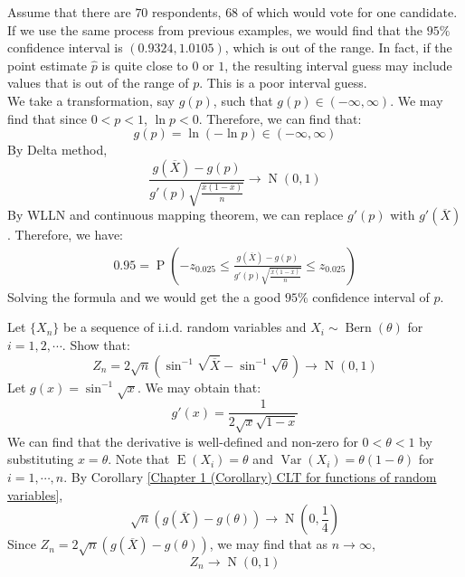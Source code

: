 \documentclass{huhtakm-template-book-v2}
\DeclareMathOperator{\prob}{P}
\DeclareMathOperator{\E}{E}
\DeclareMathOperator{\Var}{Var}
\DeclareMathOperator{\Bern}{Bern}
\DeclareMathOperator{\N}{N}
\begin{document}
\begin{eg}
	Assume that there are $70$ respondents, $68$ of which would vote for one candidate.\\
	If we use the same process from previous examples, we would find that the $95\%$ confidence interval is $(0.9324,1.0105)$, which is out of the range. In fact, if the point estimate $\hat{p}$ is quite close to $0$ or $1$, the resulting interval guess may include values that is out of the range of $p$. This is a poor interval guess.\\
	We take a transformation, say $g(p)$, such that $g(p)\in(-\infty,\infty)$. We may find that since $0<p<1$, $\ln{p}<0$. Therefore, we can find that:
	\begin{equation*}
		g(p)=\ln(-\ln{p})\in(-\infty,\infty)
	\end{equation*}
	By Delta method,
	\begin{equation*}
		\frac{g(\overline{X})-g(p)}{g'(p)\sqrt{\frac{\overline{x}(1-\overline{x})}{n}}}\to\N(0,1)
	\end{equation*}
	By WLLN and continuous mapping theorem, we can replace $g'(p)$ with $g'(\overline{X})$. Therefore, we have:
	\begin{align*}
		0.95=\prob\left(-z_{0.025}\leq	\frac{g(\overline{X})-g(p)}{g'(p)\sqrt{\frac{\overline{x}(1-\overline{x})}{n}}}\leq z_{0.025}\right)
	\end{align*}
	Solving the formula and we would get the a good $95\%$ confidence interval of $p$.
\end{eg}
\begin{eg}
	Let $\{X_{n}\}$ be a sequence of i.i.d. random variables and $X_{i}\sim\Bern(\theta)$ for $i=1,2,\cdots$. Show that:
	\begin{equation*}
		Z_{n}=2\sqrt{n}\left(\sin^{-1}{\sqrt{\overline{X}}}-\sin^{-1}{\sqrt{\theta}}\right)\to\N(0,1)
	\end{equation*}
	Let $g(x)=\sin^{-1}{\sqrt{x}}$. We may obtain that:
	\begin{equation*}
		g'(x)=\frac{1}{2\sqrt{x}\sqrt{1-x}}
	\end{equation*}
	We can find that the derivative is well-defined and non-zero for $0<\theta<1$ by substituting $x=\theta$. Note that $\E(X_{i})=\theta$ and $\Var(X_{i})=\theta(1-\theta)$ for $i=1,\cdots,n$. By Corollary \ref{Chapter 1 (Corollary) CLT for functions of random variables},
	\begin{equation*}
		\sqrt{n}(g(\overline{X})-g(\theta))\to\N\left(0,\frac{1}{4}\right)
	\end{equation*}
	Since $Z_{n}=2\sqrt{n}(g(\overline{X})-g(\theta))$, we may find that as $n\to\infty$,
	\begin{equation*}
		Z_{n}\to\N(0,1)
	\end{equation*}
\end{eg}
\end{document}
